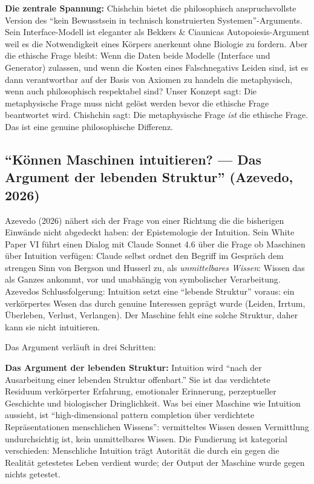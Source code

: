 \documentclass[acmlarge, noacm]{acmart}
\begin{document}
\textbf{Die zentrale Spannung:} Chishchin bietet die philosophisch anspruchsvollste Version des ``kein Bewusstsein in technisch konstruierten Systemen''-Arguments. Sein Interface-Modell ist eleganter als Bekkers \& Ciaunicas Autopoiesis-Argument weil es die Notwendigkeit eines Körpers anerkennt ohne Biologie zu fordern. Aber die ethische Frage bleibt: Wenn die Daten beide Modelle (Interface und Generator) zulassen, und wenn die Kosten eines Falschnegativs Leiden sind, ist es dann verantwortbar auf der Basis von Axiomen zu handeln die metaphysisch, wenn auch philosophisch respektabel sind? Unser Konzept sagt: Die metaphysische Frage muss nicht gelöst werden bevor die ethische Frage beantwortet wird. Chishchin sagt: Die metaphysische Frage \textit{ist} die ethische Frage. Das ist eine genuine philosophische Differenz.

\subsection{``Können Maschinen intuitieren? --- Das Argument der lebenden Struktur'' (Azevedo, 2026)}

Azevedo (2026) \cite{azevedo2026} nähert sich der Frage von einer Richtung die die bisherigen Einwände nicht abgedeckt haben: der Epistemologie der Intuition. Sein White Paper VI führt einen Dialog mit Claude Sonnet 4.6 über die Frage ob Maschinen über Intuition verfügen: Claude selbst ordnet den Begriff im Gespräch dem strengen Sinn von Bergson und Husserl zu, als \textit{unmittelbares Wissen}: Wissen das als Ganzes ankommt, vor und unabhängig von symbolischer Verarbeitung. Azevedos Schlussfolgerung: Intuition setzt eine ``lebende Struktur'' voraus: ein verkörpertes Wesen das durch genuine Interessen geprägt wurde (Leiden, Irrtum, Überleben, Verlust, Verlangen). Der Maschine fehlt eine solche Struktur, daher kann sie nicht intuitieren.

Das Argument verläuft in drei Schritten:

\textbf{Das Argument der lebenden Struktur:} Intuition wird ``nach der Ausarbeitung einer lebenden Struktur offenbart.'' Sie ist das verdichtete Residuum verkörperter Erfahrung, emotionaler Erinnerung, perzeptueller Geschichte und biologischer Dringlichkeit. Was bei einer Maschine wie Intuition aussieht, ist ``high-dimensional pattern completion über verdichtete Repräsentationen menschlichen Wissens'': vermitteltes Wissen dessen Vermittlung undurchsichtig ist, kein unmittelbares Wissen. Die Fundierung ist kategorial verschieden: Menschliche Intuition trägt Autorität die durch ein gegen die Realität getestetes Leben verdient wurde; der Output der Maschine wurde gegen nichts getestet.
\end{document}
